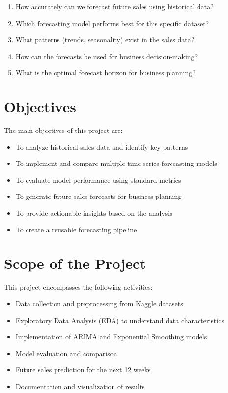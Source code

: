 \documentclass[12pt,a4paper]{report}
\begin{document}
\begin{enumerate}
    \item How accurately can we forecast future sales using historical data?
    \item Which forecasting model performs best for this specific dataset?
    \item What patterns (trends, seasonality) exist in the sales data?
    \item How can the forecasts be used for business decision-making?
    \item What is the optimal forecast horizon for business planning?
\end{enumerate}

\section{Objectives}
\label{sec:objectives}
The main objectives of this project are:

\begin{itemize}
    \item To analyze historical sales data and identify key patterns
    \item To implement and compare multiple time series forecasting models
    \item To evaluate model performance using standard metrics
    \item To generate future sales forecasts for business planning
    \item To provide actionable insights based on the analysis
    \item To create a reusable forecasting pipeline
\end{itemize}

\section{Scope of the Project}
\label{sec:scope}
This project encompasses the following activities:

\begin{itemize}
    \item Data collection and preprocessing from Kaggle datasets
    \item Exploratory Data Analysis (EDA) to understand data characteristics
    \item Implementation of ARIMA and Exponential Smoothing models
    \item Model evaluation and comparison
    \item Future sales prediction for the next 12 weeks
    \item Documentation and visualization of results
\end{itemize}
\end{document}
